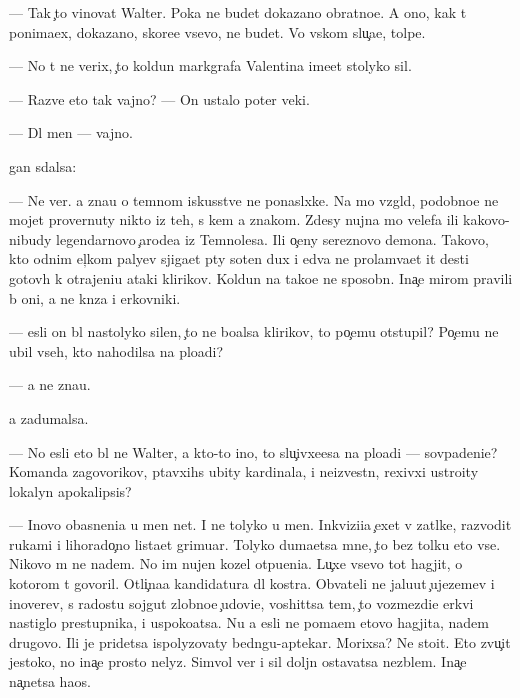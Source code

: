 \documentclass[10pt]{book}
\begin{document}
— Tak {\c}to vinovat Walter. Poka ne budet dokazano obratno{\y}e. A ono, kak t{\yi} ponima{\y}ex, dokazano, skore{\y}e vsevo, ne budet. Vo vs{\ia}kom slu{\c}a{\y}e, tolpe.

— No t{\yi} ne verix, {\c}to koldun markgrafa Valentina ime{\y}et stolyko sil.

— Razve eto tak vajno? — On ustalo poter veki.

— Dl{\ia} men{\ia} — vajno.

{\Q}{\yi}gan sdalsa:

— Ne ver{\iu}. {\Y}a zna{\y}u o temnom iskusstve ne ponasl{\yi}xke. Na mo{\y} vzgl{\ia}d, podobno{\y}e ne mojet provernuty nikto iz teh, s kem {\y}a znakom. Zdesy nujna mo{\x} velefa ili kakovo-nibudy legendarnovo {\c}arode{\y}a iz Temnoles{\y}a. Ili o{\c}eny ser{\y}eznovo demona. Takovo, kto odnim {\x}el{\c}kom paly{\q}ev sjiga{\y}et p{\ia}ty soten dux i {\y}edva ne prolam{\yi}va{\y}et {\x}it des{\ia}ti gotov{\yi}h k otrajeni{\y}u ataki klirikov. Koldun{\yi} na tako{\y}e ne sposobn{\yi}. Ina{\c}e mirom pravili b{\yi} oni, a ne kn{\ia}z{\y}a i {\q}erkovniki.

— {\Y}esli on b{\yi}l nastolyko silen, {\c}to ne bo{\y}alsa klirikov, to po{\c}emu otstupil? Po{\c}emu ne ubil vseh, kto nahodilsa na plo{\x}adi?

— {\Y}a ne zna{\y}u.

{\Y}a zadumalsa.

— No {\y}esli eto b{\yi}l ne Walter, a kto-to ino{\y}, to slu{\c}ivxe{\y}esa na plo{\x}adi — sovpadeni{\y}e? Komanda zagovor{\x}ikov, p{\yi}tavxihs{\ia} ubity kardinala, i ne{\y}izvestn{\yi}{\y}, rexivxi{\y} ustro{\y}ity lokalyn{\yi}{\y} apokalipsis?

— Inovo ob{\y}asneni{\y}a u men{\ia} net. I ne tolyko u men{\ia}. Inkvizi{\q}i{\y}a {\c}exet v zat{\yi}lke, razvodit rukami i lihorado{\c}no lista{\y}et grimuar{\yi}. Tolyko duma{\y}etsa mne, {\c}to bez tolku eto vse. Nikovo m{\yi} ne na{\y}dem. No im nujen kozel otpu{\x}eni{\y}a. Lu{\c}xe vsevo tot hagjit, o kotorom t{\yi} govoril. Otli{\c}na{\y}a kandidatura dl{\ia} kostra. Ob{\yi}vateli ne jalu{\y}ut {\c}ujezem{\q}ev i inover{\q}ev, s radost{\y}u sojgut zlobno{\y}e {\c}udovi{\x}e, voshit{\ia}tsa tem, {\c}to vozmezdi{\y}e {\Q}erkvi nastiglo prestupnika, i uspoko{\y}atsa. Nu a {\y}esli ne po{\y}ma{\y}em etovo hagjita, na{\y}dem drugovo. Ili je pridetsa ispolyzovaty bedn{\ia}gu-aptekar{\ia}. Mor{\x}ixsa? Ne sto{\y}it. Eto zvu{\c}it jestoko, no ina{\c}e prosto nelyz{\ia}. Simvol{\yi} ver{\yi} i sil{\yi} doljn{\yi} ostavatsa nez{\yi}blem{\yi}. Ina{\c}e na{\c}netsa haos.
\end{document}
